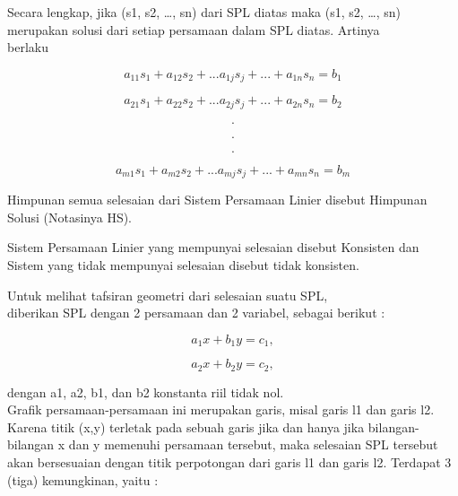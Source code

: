 \begin{eulernotebook}
\begin{eulercomment}
\begin{eulercomment}
\begin{eulercomment}
\begin{eulercomment}
\begin{eulercomment}
Secara lengkap, jika (s1, s2, …, sn) dari SPL diatas maka (s1, s2, …,
sn) merupakan solusi dari setiap persamaan dalam SPL diatas. Artinya\\
berlaku

\end{eulercomment}
\begin{eulerformula}
\[
a_{11}s_{1}+a_{12}s_{2}+... a_{1j}s_{j}+...+a_{1n}s_{n}=b_{1}
\]
\end{eulerformula}
\begin{eulerformula}
\[
a_{21}s_{1}+a_{22}s_{2}+... a_{2j}s_{j}+...+a_{2n}s_{n}=b_{2}
\]
\end{eulerformula}
\begin{eulerformula}
\[
\text{.}
\]
\end{eulerformula}
\begin{eulerformula}
\[
\text{.}
\]
\end{eulerformula}
\begin{eulerformula}
\[
\text{.}
\]
\end{eulerformula}
\begin{eulerformula}
\[
a_{m1}s_{1}+a_{m2}s_{2}+...a_{mj}s_{j}+...+a_{mn}s_{n}=b_{m}
\]
\end{eulerformula}
\begin{eulercomment}
Himpunan semua selesaian dari Sistem Persamaan Linier disebut Himpunan
Solusi (Notasinya HS).

Sistem Persamaan Linier yang mempunyai selesaian disebut Konsisten dan
Sistem yang tidak mempunyai selesaian disebut tidak konsisten.
\end{eulercomment}
\begin{eulercomment}
Untuk melihat tafsiran geometri dari selesaian suatu SPL,\\
diberikan SPL dengan 2 persamaan dan 2 variabel, sebagai berikut :

\end{eulercomment}
\begin{eulerformula}
\[
a_{1}x+b_{1}y = c_{1},
\]
\end{eulerformula}
\begin{eulerformula}
\[
a_{2}x+b_{2}y = c_{2},
\]
\end{eulerformula}
\begin{eulercomment}
dengan a1, a2, b1, dan b2 konstanta riil tidak nol.\\

Grafik persamaan-persamaan ini merupakan garis, misal garis l1 dan garis l2. Karena titik (x,y) terletak pada sebuah garis jika dan hanya jika bilangan-bilangan x dan y memenuhi persamaan tersebut, maka selesaian SPL tersebut akan bersesuaian dengan titik perpotongan dari garis l1 dan garis l2. Terdapat 3 (tiga) kemungkinan, yaitu :\\


\end{eulercomment}
\end{eulercomment}
\end{eulercomment}
\end{eulercomment}
\end{eulercomment}
\end{eulernotebook}
